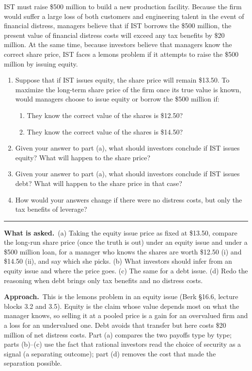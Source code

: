 \documentclass[11pt,a4paper]{article}
\newcommand{\asked}{\par\medskip\noindent\textbf{What is asked.}~}
\newcommand{\approach}{\par\smallskip\noindent\textbf{Approach.}~}
\providecommand{\tightlist}{\setlength{\itemsep}{0pt}\setlength{\parskip}{0pt}}
\newcommand{\stmtend}{\par\endgroup\nopagebreak\noindent\rule{\linewidth}{0.4pt}\par\medskip}
\begin{document}
IST must raise \$500 million to build a new production facility. Because the firm would suffer a
large loss of both customers and engineering talent in the event of financial distress, managers
believe that if IST borrows the \$500 million, the present value of financial distress costs will
exceed any tax benefits by \$20 million. At the same time, because investors believe that managers
know the correct share price, IST faces a lemons problem if it attempts to raise the \$500 million
by issuing equity.

\begin{enumerate}
\def\labelenumi{\alph{enumi}.}
\item
  Suppose that if IST issues equity, the share price will remain \$13.50. To maximize the long-term
  share price of the firm once its true value is known, would managers choose to issue equity or
  borrow the \$500 million if:

  \begin{enumerate}
  \def\labelenumii{\roman{enumii}.}
  \tightlist
  \item
    They know the correct value of the shares is \$12.50?
  \item
    They know the correct value of the shares is \$14.50?
  \end{enumerate}
\item
  Given your answer to part (a), what should investors conclude if IST issues equity? What will
  happen to the share price?
\item
  Given your answer to part (a), what should investors conclude if IST issues debt? What will happen
  to the share price in that case?
\item
  How would your answers change if there were no distress costs, but only the tax benefits of
  leverage?
\end{enumerate}
\stmtend

\asked (a) Taking the equity issue price as fixed at \$13.50, compare the long-run share price (once the truth is out) under an equity issue and under a \$500 million loan, for a manager who knows the shares are worth \$12.50 (i) and \$14.50 (ii), and say which she picks. (b) What investors should infer from an equity issue and where the price goes. (c) The same for a debt issue. (d) Redo the reasoning when debt brings only tax benefits and no distress costs.

\approach This is the lemons problem in an equity issue (Berk \S16.6, lecture blocks 3.2 and 3.5). Equity is the claim whose value depends most on what the manager knows, so selling it at a pooled price is a gain for an overvalued firm and a loss for an undervalued one. Debt avoids that transfer but here costs \$20 million of net distress costs. Part (a) compares the two payoffs type by type; parts (b)--(c) use the fact that rational investors read the choice of security as a signal (a separating outcome); part (d) removes the cost that made the separation possible.
\end{document}
